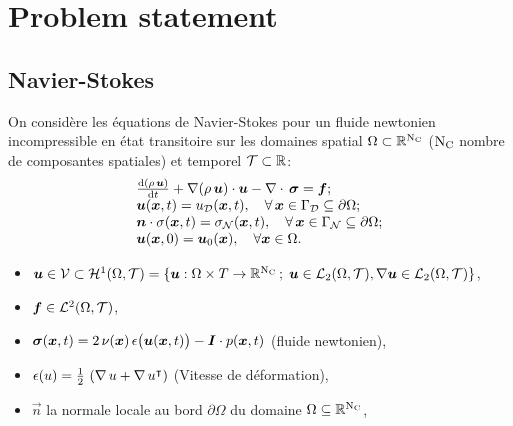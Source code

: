 \documentclass[10pt,a4paper]{article}
\begin{document}
%
\section{Problem statement}
% 
\subsection{Navier-Stokes}
%
On considère les équations de Navier-Stokes pour un fluide newtonien incompressible en état transitoire sur les domaines spatial $\Omega\subset\mathbb{R}^{\mathrm{N_{C}}}$ ($\mathrm{N_{C}}$ nombre de composantes spatiales) et temporel $\mathcal T\subset\mathbb{R}$:
%
\begin{equation}
\label{eq:NS}
\begin{array}{l}
\frac{\mathrm{d}( \rho\, \boldsymbol{u})}{\mathrm{d} t} + \nabla (\rho\, \boldsymbol{u}) \cdot \boldsymbol{u} - \nabla\cdot \,\boldsymbol{\sigma} = \boldsymbol{f}; \\
\boldsymbol{u}(\boldsymbol{x}, t) = u_{\mathcal{D}}(\boldsymbol{x}, t), \quad \forall \, \boldsymbol{x} \in \Gamma_{\mathcal D}\subseteq \partial\Omega;  \\
\boldsymbol{n} \cdot \sigma(\boldsymbol{x}, t) = \sigma_{\mathcal N}(\boldsymbol{x}, t), \quad \forall \, \boldsymbol{x} \in \Gamma_{\mathcal N}\subseteq \partial\Omega;  \\
\boldsymbol{u}(\boldsymbol{x}, 0) = \boldsymbol{u}_0(\boldsymbol{x}), \quad \forall \boldsymbol{x} \in \Omega.
\end{array}
\end{equation}
%
%
\begin{itemize}
\item $\boldsymbol{u}\in \mathcal{V} \subset \mathcal{H}^1(\Omega, \mathcal{T}) = \{\boldsymbol{u}: \Omega\times T \rightarrow \mathbb{R}^{\mathrm{N_{C}}}\,;\; \boldsymbol{u}\in \mathcal L_2(\Omega, \mathcal T), \nabla \boldsymbol{u}\in \mathcal L_2(\Omega, \mathcal T) \}$,
\item $\boldsymbol{f} \in \mathcal{L}^2(\Omega, \mathcal{T})$,
\item $\boldsymbol{\sigma}(\boldsymbol{x}, t) = 2\,\nu(\boldsymbol{x}) \, \epsilon\big(\boldsymbol{u}(\boldsymbol{x}, t)\big) - \boldsymbol{I}\cdot p(\boldsymbol{x}, t)$ (fluide newtonien),
\item $\epsilon(u) = \frac{1}{2}\,\left(\nabla\,u + \nabla\, u^\intercal\right)$ (Vitesse de déformation),
\item $\vec n$ la normale locale au bord $\partial \Omega$ du domaine $\Omega \subseteq \mathbb{R}^{\mathrm{N_{C}}}$, 
\end{itemize}
%
%
\end{document}
